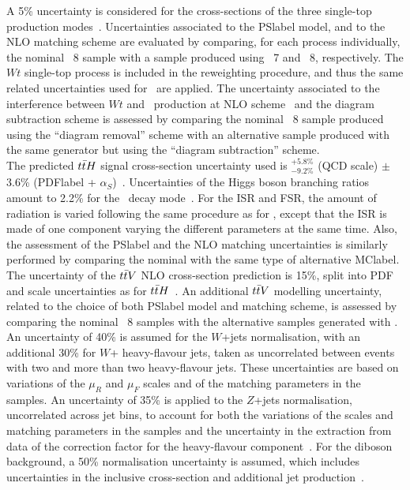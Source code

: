 A 5\% uncertainty is considered for the cross-sections of the three single-top production modes~\cite{Martin_2009,toprecomendation,Martin_2009v2,Aliev_2011,Kant_2015}. Uncertainties associated to the \acrshort{PSlabel} model, and to the NLO matching scheme are evaluated by comparing, for each process individually, the nominal \POWHEGPYTHIA~8 sample with a sample produced using \POWHEGHERWIG~7 and \MGMCatNLOPYTHIA~8, respectively. The $Wt$ single-top process is included in the reweighting procedure, and thus the same related uncertainties used for \ttbar\ are applied. The uncertainty associated to the interference between $Wt$ and \ttbar\ production at NLO scheme~\cite{Frixione_2008} and the diagram
subtraction scheme is assessed by comparing the nominal \POWHEGPYTHIA~8 sample produced using the “diagram removal” scheme with an alternative sample produced with the same generator but using the “diagram subtraction” scheme.\\

The predicted $t\bar{t} H$ signal cross-section uncertainty used is $^{+5.8\%}_{-9.2\%}$ (QCD scale) $\pm$3.6\% (\acrshort{PDFlabel} + $\alpha_S$)~\cite{Frixione_2008,CYRM-2017-002,PhysRevD.19.941,BEENAKKER2003151,Dawson_2003,Zhang_2014,10.48550/arxiv.1504.03446}. Uncertainties of the Higgs boson branching ratios amount to 2.2\% for the \bbar\ decay mode~\cite{CYRM-2017-002}. For the ISR and FSR, the amount of radiation is varied following the same procedure as for \ttbar, except that the ISR is made of one component varying the different parameters at the same time. Also, the assessment of the \acrshort{PSlabel} and the NLO matching uncertainties is similarly performed by comparing the nominal with the same type of alternative \acrshort{MClabel}.\\

The uncertainty of the $t\bar{t} V$ NLO cross-section prediction is 15\%, split into PDF and scale uncertainties as for $t\bar{t} H$~\cite{CYRM-2017-002,Campbell_2012}. An additional $t\bar{t} V$ modelling uncertainty, related to the choice of both \acrshort{PSlabel} model and matching scheme, is assessed by comparing the nominal \MGMCatNLOPYTHIA~8 samples with the alternative samples generated with \SHERPA.\\

An uncertainty of 40\% is assumed for the $W$+jets normalisation, with an additional 30\% for $W$+ heavy-flavour jets, taken as uncorrelated between events with two and more than two heavy-flavour jets. These uncertainties are based on variations of the $\mu_R$ and $\mu_F$ scales and of the matching parameters in the \SHERPA samples. An uncertainty of 35\% is applied to the $Z$+jets normalisation, uncorrelated across jet bins, to account for both the variations of the scales and matching parameters in the \SHERPA samples and the uncertainty in the extraction from data of the correction factor for the heavy-flavour
component~\cite{Ball_2015,Campbell_2012}. For the diboson background, a 50\% normalisation uncertainty is assumed, which includes uncertainties in the inclusive cross-section and additional jet production~\cite{ATL-PHYS-PUB-2016-002}.\\

